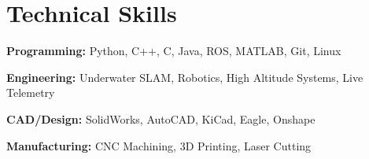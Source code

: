 \section{Technical Skills}
    \begin{onecolentry}
        \textbf{Programming:} Python, C++, C, Java, ROS, MATLAB, Git, Linux
    \end{onecolentry}

    \vspace{0.10 cm}

    \begin{onecolentry}
        \textbf{Engineering:} Underwater SLAM, Robotics, High Altitude Systems, Live Telemetry
    \end{onecolentry}
    

    \vspace{0.10 cm}

    \begin{onecolentry}
        \textbf{CAD/Design:} SolidWorks, AutoCAD, KiCad, Eagle, Onshape
    \end{onecolentry}

    \vspace{0.10 cm}

    \begin{onecolentry}
        \textbf{Manufacturing:} CNC Machining, 3D Printing, Laser Cutting
    \end{onecolentry}